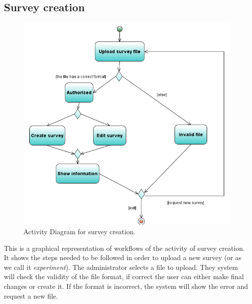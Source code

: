 \documentclass[a4paper,12pt,oneside]{report}
\begin{document}
\subsection {Survey creation}
\begin{figure}[h!]
  \begin{center}
   \includegraphics[width=13.5cm]{pics/Activity.png}
  \end{center}
\caption{Activity Diagram for survey creation.}
\end{figure}
This is a graphical representation of workflows of the activity of survey creation. It shows the steps needed to be followed in order to upload a new survey (or as we call it \emph{experiment}). The administrator selects a file to upload. They system will check the validity of the file format, if correct the user can either make final changes or create it. If the format is incorrect, the system will show the error and request a new file.
\newpage
\end{document}
